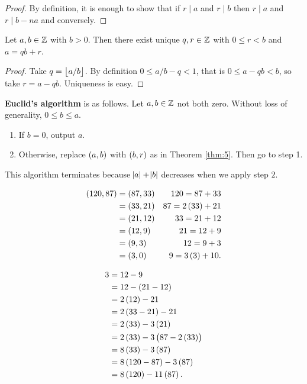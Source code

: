 \begin{proof}
By definition, it is enough to show that if $ r \mid a $ and $ r \mid b $ then $ r \mid a $ and $ r \mid b - na $ and conversely.
\end{proof}

\begin{theorem}
\label{thm:5}
Let $ a, b \in \mathbb{Z} $ with $ b > 0 $. Then there exist unique $ q, r \in \mathbb{Z} $ with $ 0 \le r < b $ and $ a = qb + r $.
\end{theorem}

\begin{proof}
Take $ q = \left\lfloor a / b \right\rfloor $. By definition $ 0 \le a / b - q < 1 $, that is $ 0 \le a - qb < b $, so take $ r = a - qb $. Uniqueness is easy.
\end{proof}

\textbf{Euclid's algorithm} is as follows. Let $ a, b \in \mathbb{Z} $ not both zero. Without loss of generality, $ 0 \le b \le a $.
\begin{enumerate}[leftmargin=0.5in, label=Step \arabic*.]
\item If $ b = 0 $, output $ a $.
\item Otherwise, replace $ \br{a, b} $ with $ \br{b, r} $ as in Theorem \ref{thm:5}. Then go to step 1.
\end{enumerate}
This algorithm terminates because $ \abs{a} + \abs{b} $ decreases when we apply step $ 2 $.

\begin{example*}
\hfill

\begin{minipage}{0.5\textwidth}
\begin{align*}
\br{120, 87}
& = \br{87, 33} & 120 = 87 + 33 \\
& = \br{33, 21} & 87 = 2\br{33} + 21 \\
& = \br{21, 12} & 33 = 21 + 12 \\
& = \br{12, 9} & 21 = 12 + 9 \\
& = \br{9, 3} & 12 = 9 + 3 \\
& = \br{3, 0} & 9 = 3\br{3} + 10.
\end{align*}
\end{minipage}
\begin{minipage}{0.4\textwidth}
\begin{align*}
3
& = 12 - 9 \\
& = 12 - \br{21 - 12} \\
& = 2\br{12} - 21 \\
& = 2\br{33 - 21} - 21 \\
& = 2\br{33} - 3\br{21} \\
& = 2\br{33} - 3\br{87 - 2\br{33}} \\
& = 8\br{33} - 3\br{87} \\
& = 8\br{120 - 87} - 3\br{87} \\
& = 8\br{120} - 11\br{87}.
\end{align*}
\end{minipage}
\end{example*}


